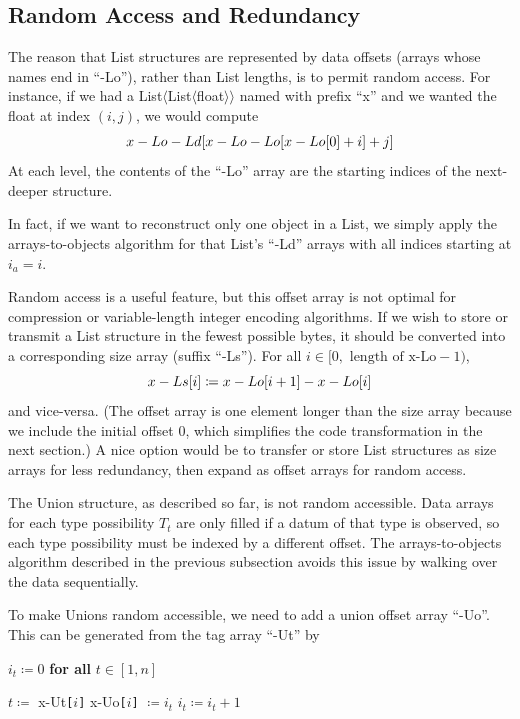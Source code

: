 \documentclass[10pt, conference, compsocconf]{IEEEtran}
\begin{document}
\subsection{Random Access and Redundancy}
\label{random-access-and-redundancy}

The reason that List structures are represented by data offsets (arrays whose names end in ``-Lo''), rather than List lengths, is to permit random access. For instance, if we had a List$\langle$List$\langle$float$\rangle\rangle$ named with prefix ``x'' and we wanted the float at index $(i, j)$, we would compute
\[ \mbox{x-Lo-Ld{\tt [}x-Lo-Lo{\tt [}x-Lo{\tt [}} 0 \mbox{\tt ]} + i \mbox{\tt ]} + j \mbox{\tt ]} \]
At each level, the contents of the ``-Lo'' array are the starting indices of the next-deeper structure.

In fact, if we want to reconstruct only one object in a List, we simply apply the arrays-to-objects algorithm for that List's ``-Ld'' arrays with all indices starting at $i_a = i$.

Random access is a useful feature, but this offset array is not optimal for compression or variable-length integer encoding algorithms. If we wish to store or transmit a List structure in the fewest possible bytes, it should be converted into a corresponding size array (suffix ``-Ls''). For all $i \in [0, \mbox{ length of x-Lo} - 1)$,
\[ \mbox{x-Ls{\tt [}} i \mbox{\tt ]} \coloneqq \mbox{x-Lo{\tt [}} i + 1 \mbox{\tt ]} - \mbox{x-Lo{\tt [}} i \mbox{\tt ]} \]
and vice-versa. (The offset array is one element longer than the size array because we include the initial offset 0, which simplifies the code transformation in the next section.) A nice option would be to transfer or store List structures as size arrays for less redundancy, then expand as offset arrays for random access.

The Union structure, as described so far, is not random accessible. Data arrays for each type possibility $T_t$ are only filled if a datum of that type is observed, so each type possibility must be indexed by a different offset. The arrays-to-objects algorithm described in the previous subsection avoids this issue by walking over the data sequentially.

To make Unions random accessible, we need to add a union offset array ``-Uo''. This can be generated from the tag array ``-Ut'' by
\begin{algorithmic}
\vspace{0.15 cm}
\STATE $i_t \coloneqq 0$ {\bf for all} $t \in [1, n]$

\vspace{0.15 cm}
\STATE $t \coloneqq$ \mbox{x-Ut}{\tt [}$i${\tt ]}
\STATE \mbox{x-Uo}{\tt [}$i${\tt ]} $\coloneqq i_t$
\STATE $i_t \coloneqq i_t + 1$
\ENDFOR
\end{algorithmic}
\end{document}
